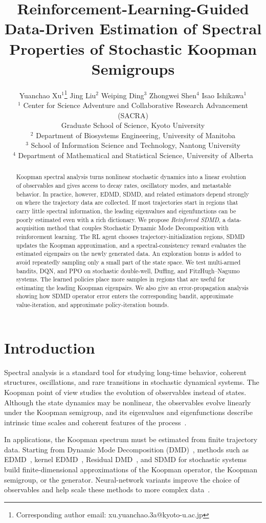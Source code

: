 \documentclass{article}
\title{Reinforcement-Learning-Guided Data-Driven Estimation of Spectral Properties of Stochastic Koopman Semigroups}
\author{Yuanchao Xu$^{1}$\thanks{Corresponding author email: xu.yuanchao.3a@kyoto-u.ac.jp}\enspace \enspace
Jing Liu$^{2}$\enspace
Weiping Ding$^{3}$\enspace
Zhongwei Shen$^{4}$\enspace
Isao Ishikawa$^{1}$\enspace\\
$^1$ Center for Science Adventure and Collaborative Research Advancement (SACRA)\\
Graduate School of Science,
Kyoto University\\
$^2$ Department of Biosystems Engineering, University of Manitoba\\
$^3$ School of Information Science and Technology, Nantong University\\
$^4$ Department of Mathematical and Statistical Science, University of Alberta\\
}
\numberwithin{equation}{section}
\theoremstyle{definition}
\begin{document}
\maketitle
\begin{abstract}
Koopman spectral analysis turns nonlinear stochastic dynamics into a linear evolution of observables and gives access to decay rates, oscillatory modes, and metastable behavior. In practice, however, EDMD, SDMD, and related estimators depend strongly on where the trajectory data are collected. If most trajectories start in regions that carry little spectral information, the leading eigenvalues and eigenfunctions can be poorly estimated even with a rich dictionary. We propose \emph{Reinforced SDMD}, a data-acquisition method that couples Stochastic Dynamic Mode Decomposition with reinforcement learning. The RL agent chooses trajectory-initialization regions, SDMD updates the Koopman approximation, and a spectral-consistency reward evaluates the estimated eigenpairs on the newly generated data. An exploration bonus is added to avoid repeatedly sampling only a small part of the state space. We test multi-armed bandits, DQN, and PPO on stochastic double-well, Duffing, and FitzHugh--Nagumo systems. The learned policies place more samples in regions that are useful for estimating the leading Koopman eigenpairs. We also give an error-propagation analysis showing how SDMD operator error enters the corresponding bandit, approximate value-iteration, and approximate policy-iteration bounds.
\end{abstract}


\section{Introduction}
Spectral analysis is a standard tool for studying long-time behavior, coherent structures, oscillations, and rare transitions in stochastic dynamical systems. The Koopman point of view studies the evolution of observables instead of states. Although the state dynamics may be nonlinear, the observables evolve linearly under the Koopman semigroup, and its eigenvalues and eigenfunctions describe intrinsic time scales and coherent features of the process~\cite{Koopman1931,koopman1932dynamical,mezic2005spectral}.

In applications, the Koopman spectrum must be estimated from finite trajectory data. Starting from Dynamic Mode Decomposition (DMD)~\cite{rowley2009spectral,tu2013dynamic}, methods such as EDMD~\cite{Williams_2015}, kernel EDMD~\cite{williams2015kernelkoopman}, Residual DMD~\cite{colbrook2024rigorous}, and SDMD for stochastic systems~\cite{xu2025datadrivenframeworkkoopmansemigroup} build finite-dimensional approximations of the Koopman operator, the Koopman semigroup, or the generator. Neural-network variants improve the choice of observables and help scale these methods to more complex data~\cite{pmlr-v119-azencot20a,baikonode,bai2025hierarchical,cheng2025machine,chretien2025using,gao2025coloke,li2017extended,lusch2018deep,yang2025tensor}.
\end{document}
